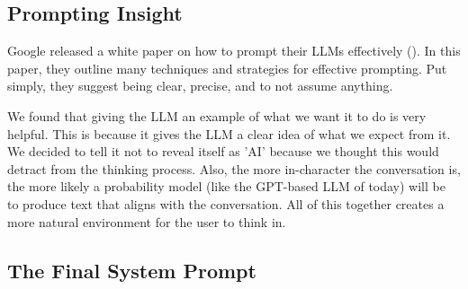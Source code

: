 \documentclass[letterpaper,11pt,leqno]{article}
\begin{document}
\subsection{Prompting Insight}

Google released a white paper on how to prompt their LLMs effectively (\cite{PromptEngineering}). In this paper, they outline many techniques and strategies for effective prompting. Put simply, they suggest being clear, precise, and to not assume anything. 

We found that giving the LLM an example of what we want it to do is very helpful. This is because it gives the LLM a clear idea of what we expect from it. We decided to tell it not to reveal itself as 'AI' because we thought this would detract from the thinking process. Also, the more in-character the conversation is, the more likely a probability model (like the GPT-based LLM of today) will be to produce text that aligns with the conversation. All of this together creates a more natural environment for the user to think in.

\subsection{The Final System Prompt}
\end{document}
